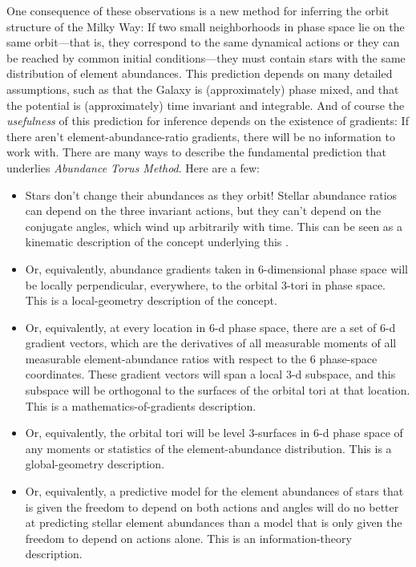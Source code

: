 \documentclass[modern]{aastex63}
\newcommand{\methodname}{\textsl{Abundance Torus Method}}
\begin{document}
One consequence of these observations is a new method for inferring
the orbit structure of the Milky Way:
If two small neighborhoods in phase space lie on the same orbit---that
is, they correspond to the same dynamical actions or they can be reached
by common initial conditions---they must contain stars with the same distribution of
element abundances.
This prediction depends on many detailed assumptions, such as that
the Galaxy is (approximately) phase mixed, and that the potential is
(approximately) time invariant and integrable.
And of course the \emph{usefulness} of this prediction for inference
depends on the existence of gradients: If there aren't
element-abundance-ratio gradients, there will be no information to work
with.
There are many ways to describe the fundamental prediction that underlies \methodname.
Here are a few:
\begin{itemize}
\item
  Stars don't change their abundances as they orbit!  Stellar
  abundance ratios can depend on the three invariant actions, but they
  can't depend on the conjugate angles, which wind up arbitrarily with time.
  This can be seen as a kinematic description of the concept underlying this \documentname.
\item
  Or, equivalently, abundance gradients taken in 6-dimensional phase space will be
  locally perpendicular, everywhere, to the orbital 3-tori in phase space.
  This is a local-geometry description of the concept.
\item
  Or, equivalently, at every location in 6-d phase space, there are a set of 6-d
  gradient vectors, which are the derivatives of all measurable
  moments of all measurable element-abundance ratios with respect to
  the 6 phase-space coordinates. These gradient vectors will span a
  local 3-d subspace, and this subspace will be orthogonal to the surfaces
  of the orbital tori at that location.
  This is a mathematics-of-gradients description.
\item
  Or, equivalently, the orbital tori will be level 3-surfaces in 6-d phase space of any
  moments or statistics of the element-abundance distribution.
  This is a global-geometry description.
\item
  Or, equivalently, a predictive model for the element abundances of stars
  that is given the freedom to depend on both actions and angles will do no
  better at predicting stellar element abundances than a model that is only
  given the freedom to depend on actions alone.
  This is an information-theory description.
\end{itemize}
\end{document}
